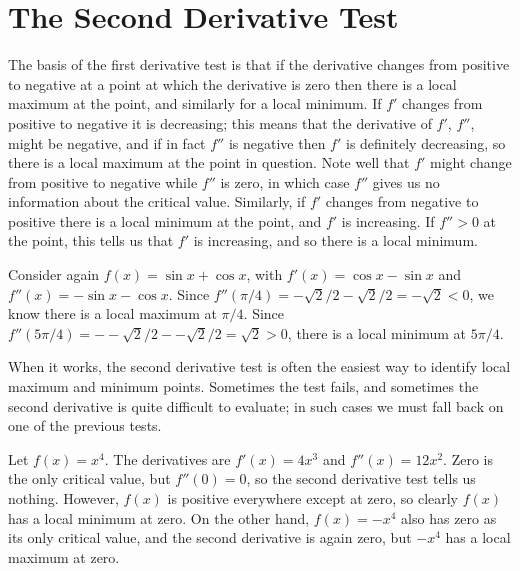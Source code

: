 \section{The Second Derivative Test}

The basis of the first derivative test is that if the derivative
changes from positive to negative at a point at which the derivative
is zero then there is a local maximum at the point, and similarly for
a local minimum. If $f'$ changes from positive to negative it is
decreasing; this means that the derivative of $f'$, $f''$, might be negative,
and if in fact $f''$ is negative then $f'$ is definitely
decreasing, so there is a local maximum at the point in question. Note
well that $f'$ might change from positive to negative while $f''$ is
zero, in which case $f''$ gives us no information about the critical
value. Similarly, if $f'$ changes from negative to positive there is a
local minimum at the point, and $f'$ is increasing. If $f''>0$ at the
point, this tells us that $f'$ is increasing, and so there is a local
minimum. 

\begin{example}
Consider again $f(x)=\sin x + \cos x$, with $f'(x)=\cos x-\sin x$ and
$ f''(x)=-\sin x -\cos x$. Since $f''(\pi/4)=-\sqrt{2}/2-\sqrt2/2=-\sqrt2<0$,
we know there is a local maximum at $\pi/4$. Since
$f''(5\pi/4)=--\sqrt{2}/2--\sqrt2/2=\sqrt2>0$, there is a local
minimum at $5\pi/4$.
\end{example}

When it works, the second derivative test is often the easiest way to
identify local maximum and minimum points. Sometimes the test fails,
and sometimes the second derivative is quite difficult to evaluate; in
such cases we must fall back on one of the previous tests.

\begin{example}
Let $f(x)=x^4$. The derivatives are $f'(x)=4x^3$ and
$f''(x)=12x^2$. Zero is the only critical value, but $f''(0)=0$, so
the second derivative test tells us nothing. However, $f(x)$ is
positive everywhere except at zero, so clearly $f(x)$ has a local
minimum at zero. On the other hand, $f(x)=-x^4$ also has zero as its
only critical value, and the second derivative is again zero, but
$-x^4$ has a local maximum at zero.
\end{example}

